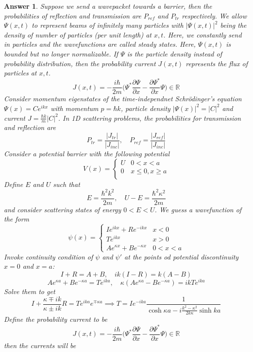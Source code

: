 \documentclass[a4paper]{article}
\newtheorem{ans}{Answer}[subsection]
\theoremstyle{new}
\begin{document}
\begin{ans}
Suppose we send a wavepacket towards a barrier, then the probabilities of reflection and transmission are $P_{ref}$ and $P_{tr}$ respectively. We allow $\Psi(x,t)$ to represent beams of infinitely many particles with $|\Psi(x,t)|^2$ being the density of number of particles (per unit length) at $x,t$. Here, we constantly send in particles and the wavefunctions are called steady states. Here, $\Psi(x,t)$ is bounded but no longer normalizable. If $\Psi$ is the particle density instead of probability distribution, then the probability current $J(x,t)$ represents the flux of particles at $x,t$. 
$$J(x,t)=-\frac{i\hbar}{2m}\bigg(\Psi^*\frac{\partial\Psi}{\partial x}-\frac{\partial\Psi^*}{\partial x}\Psi\bigg)\in\mathbb{R}$$
Consider momentum eigenstates of the time-independnet Schr\"{o}dinger's equation $\Psi(x)=Ce^{ikx}$ with momentum $p=\hbar k$, particle density $|\Psi(x)|^2=|C|^2$ and current $J=\frac{\hbar k}{m}|C|^2$. In 1D scattering problems, the probabilities for transmission and reflection are
$$P_{tr}=\frac{|J_{tr}|}{|J_{inc}|},\quad P_{ref}=\frac{|J_{ref}|}{|J_{inc}|}$$
Consider a potential barrier with the following potential
   $$
V(x)=
\left\{
        \begin{array}{ll}
      U & 0<x<a\\
	0& x\leq 0,x\geq a\\
        \end{array}
    \right.
$$
Define $E$ and $U$ such that
$$E=\frac{\hbar^2k^2}{2m},\quad U-E=\frac{\hbar^2\kappa^2}{2m}$$
and consider scattering states of energy $0<E<U$. We guess a wavefunction of the form
       $$
\psi(x)=
\left\{
        \begin{array}{ll}
      Ie^{ikx}+Re^{-ikx} & x<0\\
 Te^{ikx}& x>0\\
 Ae^{\kappa x}+Be^{-\kappa x}&0<x<a
        \end{array}
    \right.
$$
Invoke continuity condition of $\psi$ and $\psi'$ at the points od potential discontinuity $x=0$ and $x=a$:
$$I+R=A+B,\quad ik(I-R)=k(A-B)$$
$$Ae^{\kappa a}+Be^{-\kappa a}=Te^{ika},\quad \kappa (Ae^{\kappa a}-Be^{-\kappa a})=ikTe^{ika}$$
Solve them to get 
$$I+\frac{\kappa\mp ik}{\kappa\pm ik}R=Te^{ika}e^{\mp\kappa a}\implies T=Ie^{-ika}\frac{1}{\cosh\kappa a-i\frac{k^2-\kappa^2}{2k\kappa}\sinh ka}$$
Define the probability current to be
$$J(x,t)=-\frac{i\hbar}{2m}\bigg(\Psi^*\frac{\partial\Psi}{\partial x}-\frac{\partial\Psi^*}{\partial x}\Psi\bigg)\in\mathbb{R}$$
then the currents will be
       $$
$$
\end{ans}
\end{document}
